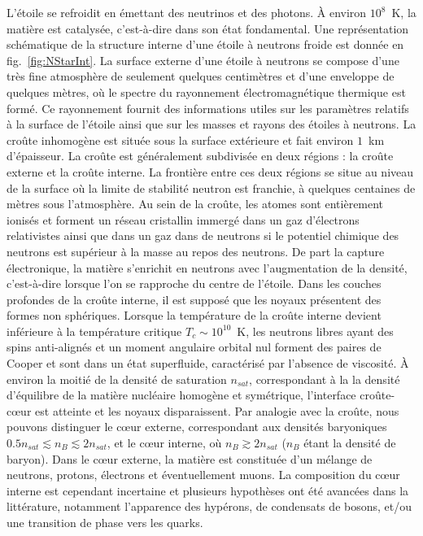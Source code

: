 L'étoile se refroidit en émettant des neutrinos et des photons. À environ 
$10^8$~K, la matière est catalysée, c'est-à-dire dans son état fondamental. 
Une représentation schématique de la structure interne d'une étoile à neutrons 
froide est donnée en fig.~\ref{fig:NStarInt}. 
La surface externe d'une étoile à neutrons se compose d'une très fine 
atmosphère de seulement quelques centimètres et d'une enveloppe de quelques 
mètres, où le spectre du rayonnement électromagnétique thermique est formé. Ce 
rayonnement fournit des informations utiles sur les paramètres relatifs à la 
surface de l'étoile ainsi que sur les masses et rayons des étoiles à neutrons. 
La croûte inhomogène est située sous la surface extérieure et fait 
environ $1$~km d'épaisseur. 
La croûte est généralement subdivisée en deux régions : la croûte externe et la 
croûte interne. La frontière entre ces deux régions se situe au niveau de
la surface où la limite de stabilité neutron est franchie, à quelques centaines 
de mètres sous l'atmosphère. 
Au sein de la croûte, les atomes sont entièrement ionisés et forment un réseau
cristallin immergé dans un gaz d'électrons relativistes ainsi que dans un gaz 
dans de neutrons si le potentiel chimique des neutrons est supérieur à la masse 
au repos des neutrons. 
De part la capture électronique, la matière s'enrichit en neutrons avec 
l'augmentation de la densité, c'est-à-dire lorsque l'on se rapproche du centre 
de l'étoile. 
Dans les couches profondes de la croûte interne, il est supposé que les noyaux 
présentent des formes non sphériques. Lorsque la température de la croûte 
interne devient inférieure à la température critique $T_c \sim 10^{10}$~K, les 
neutrons libres ayant des spins anti-alignés et un moment angulaire orbital nul 
forment des paires de Cooper et sont dans un état superfluide, caractérisé par 
l'absence de viscosité. 
%
À environ la moitié de la densité de saturation $n_{sat}$, correspondant à la 
la densité d'équilibre de la matière nucléaire homogène et symétrique, 
l'interface croûte-c\oe ur est atteinte et les noyaux disparaissent. 
Par analogie avec la croûte, nous pouvons distinguer le c\oe ur externe, 
correspondant aux densités baryoniques $0.5n_{sat} \lesssim n_B 
\lesssim 2n_{sat}$, et le c\oe ur interne, où $n_B \gtrsim 2n_{sat}$ ($n_B$
étant la densité de baryon). 
Dans le c\oe ur externe, la matière est constituée d'un mélange de neutrons, 
protons, électrons et éventuellement muons. La composition du c\oe ur interne 
est cependant incertaine et plusieurs hypothèses ont été avancées dans la
littérature, notamment l'apparence des hypérons, de condensats de bosons, et/ou 
une transition de phase vers les quarks. 
\\


